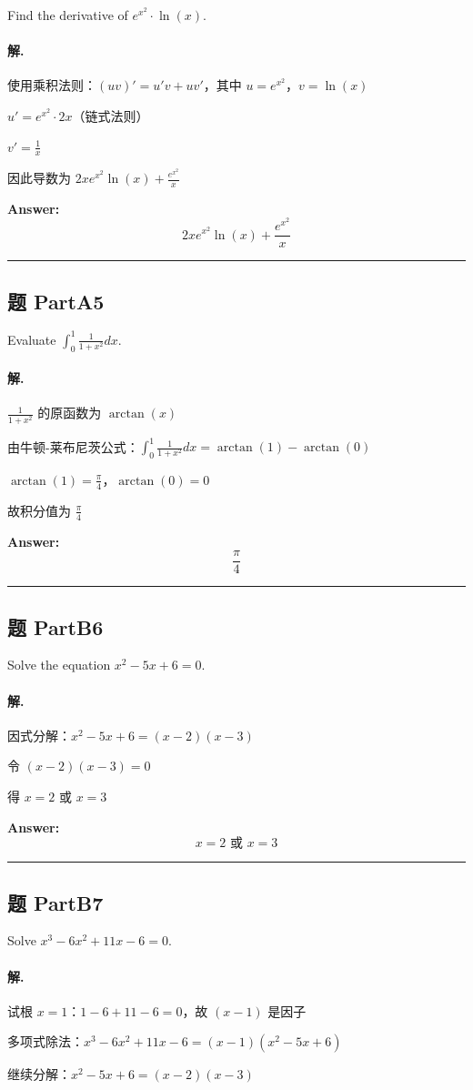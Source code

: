 \documentclass[12pt, a4paper]{article}
\newcommand{\problem}[1]{\subsection*{题 #1}}
\newcommand{\solution}{\paragraph{解.}}
\begin{document}
Find the derivative of $e^{x^2} \cdot \ln(x)$.

\solution

使用乘积法则：$(uv)' = u'v + uv'$，其中 $u = e^{x^2}$，$v = \ln(x)$

$u' = e^{x^2} \cdot 2x$（链式法则）

$v' = \frac{1}{x}$

因此导数为 $2x e^{x^2}\ln(x) + \frac{e^{x^2}}{x}$

\textbf{Answer:}
\[\boxed{2x e^{x^2}\ln(x) + \frac{e^{x^2}}{x}}\]

\vspace{1em}
\hrule
\vspace{1em}

\problem{PartA5}

Evaluate $\int_0^1 \frac{1}{1+x^2} dx$.

\solution

$\frac{1}{1+x^2}$ 的原函数为 $\arctan(x)$

由牛顿-莱布尼茨公式：$\int_0^1 \frac{1}{1+x^2}dx = \arctan(1) - \arctan(0)$

$\arctan(1) = \frac{\pi}{4}$，$\arctan(0) = 0$

故积分值为 $\frac{\pi}{4}$

\textbf{Answer:}
\[\boxed{\frac{\pi}{4}}\]

\vspace{1em}
\hrule
\vspace{1em}

\problem{PartB6}

Solve the equation $x^2 - 5x + 6 = 0$.

\solution

因式分解：$x^2 - 5x + 6 = (x-2)(x-3)$

令 $(x-2)(x-3) = 0$

得 $x = 2$ 或 $x = 3$

\textbf{Answer:}
\[\boxed{x = 2 \text{ 或 } x = 3}\]

\vspace{1em}
\hrule
\vspace{1em}

\problem{PartB7}

Solve $x^3 - 6x^2 + 11x - 6 = 0$.

\solution

试根 $x=1$：$1 - 6 + 11 - 6 = 0$，故 $(x-1)$ 是因子

多项式除法：$x^3 - 6x^2 + 11x - 6 = (x-1)(x^2 - 5x + 6)$

继续分解：$x^2 - 5x + 6 = (x-2)(x-3)$
\end{document}
